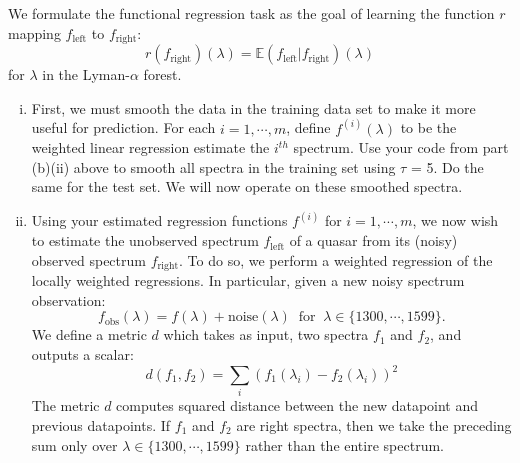 \documentclass[11pt]{article}
\begin{document}
We formulate the functional regression task as the goal of learning the function $r$ mapping $f_\text{left}$ to $f_\text{right}$:
$$r(f_\text{right})(\lambda) = \mathbb{E}(f_\text{left} | f_\text{right})(\lambda)$$
for $\lambda$ in the Lyman-$\alpha$ forest.
\begin{enumerate}[i.]
  \item First, we must smooth the data in the training data set to make it more useful for prediction. For each $i = 1, \cdots,m$, define $f^{(i)}(\lambda)$ to be the weighted linear regression estimate the $i^{th}$ spectrum. Use your code from part (b)(ii) above to smooth all spectra in the training set using $\tau$ = 5. Do the same for the test set. We will now operate on these smoothed spectra.
  \item Using your estimated regression functions $f^{(i)}$ for $i = 1, \cdots, m$, we now wish to estimate the unobserved spectrum $f_\text{left}$ of a quasar from its (noisy) observed spectrum $f_\text{right}$. To do so, we perform a weighted regression of the locally weighted regressions. In particular, given a new noisy spectrum observation:
$$f_\text{obs}(\lambda) = f(\lambda) + \text{noise}(\lambda)\ \text{ for } \ \lambda \in \{1300, \cdots, 1599\}. $$
We define a metric $d$ which takes as input, two spectra $f_1$ and $f_2$, and outputs a scalar:
$$d(f_1,f_2) = \sum_{i}\left(f_1(\lambda_i)-f_2(\lambda_i)\right)^2$$
The metric $d$ computes squared distance between the new datapoint and previous datapoints. If $f_1$ and $f_2$ are right spectra, then we take the preceding sum only over $\lambda \in \{1300, \cdots, 1599\}$ rather than the entire spectrum.


\end{enumerate}
\end{document}
